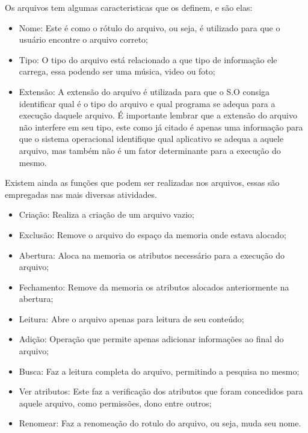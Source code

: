 \documentclass[12pt,a4paper,openany,oneside]{abntex2}
\begin{document}
Os arquivos tem algumas caracteristicas que os definem, e são elas:

\begin{itemize}

\item Nome: Este é como o rótulo do arquivo, ou seja, é utilizado para que o usuário encontre o arquivo correto;
\item Tipo: O tipo do arquivo está relacionado a que tipo de informação ele carrega, essa podendo ser uma música, video ou foto;
\item Extensão: A extensão do arquivo é utilizada para que o S.O consiga identificar qual é o tipo do arquivo e qual programa se adequa para a execução daquele arquivo. É importante lembrar que a extensão do arquivo não interfere em seu tipo, este como já citado é apenas uma informação para que o sistema operacional identifique qual aplicativo se adequa a aquele arquivo, mas também não é um fator determinante para a execução do mesmo.

\end{itemize}

Existem ainda as funções que podem ser realizadas nos arquivos, essas são empregadas nas mais diversas atividades.

\begin{itemize}

\item Criação: Realiza a criação de um arquivo vazio;
\item Exclusão: Remove o arquivo do espaço da memoria onde estava alocado;
\item Abertura: Aloca na memoria os atributos necessário para a execução do arquivo;
\item Fechamento: Remove da memoria os atributos alocados anteriormente na abertura;
\item Leitura: Abre o arquivo apenas para leitura de seu conteúdo;
\item Adição: Operação que permite apenas adicionar informações ao final do arquivo;
\item Busca: Faz a leitura completa do arquivo, permitindo a pesquisa no mesmo;
\item Ver atributos: Este faz a verificação dos atributos que foram concedidos para aquele arquivo, como permissões, dono entre outros;
\item Renomear: Faz a renomeação do rotulo do arquivo, ou seja, muda seu nome.

\end{itemize}
\end{document}
